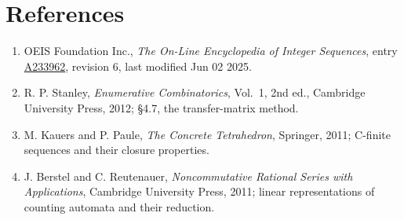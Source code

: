 \documentclass[11pt]{article}
\theoremstyle{definition}
\begin{document}
\section{References}

\begin{enumerate}

\item OEIS Foundation Inc., \emph{The On-Line Encyclopedia of Integer Sequences}, entry \href{https://oeis.org/A233962}{A233962}, revision 6, last modified Jun 02 2025.

\item R. P. Stanley, \emph{Enumerative Combinatorics}, Vol.~1, 2nd ed., Cambridge University Press, 2012; \S4.7, the transfer-matrix method.

\item M. Kauers and P. Paule, \emph{The Concrete Tetrahedron}, Springer, 2011; C-finite sequences and their closure properties.

\item J. Berstel and C. Reutenauer, \emph{Noncommutative Rational Series with Applications}, Cambridge University Press, 2011; linear representations of counting automata and their reduction.

\end{enumerate}
\end{document}
